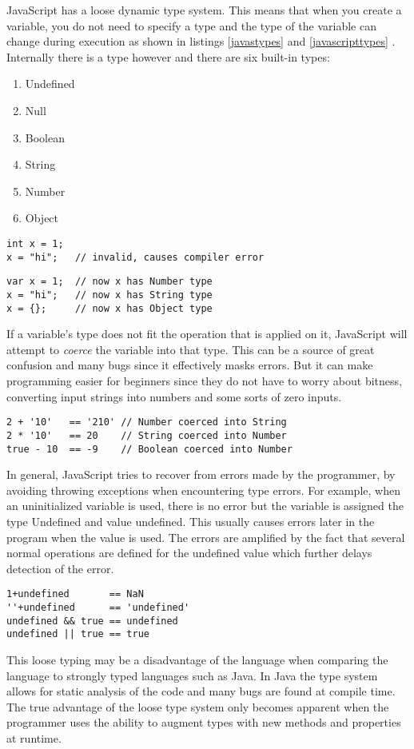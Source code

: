 JavaScript has a loose dynamic type system. This means that when you create a variable, you do not need to specify a type and the type of the variable can change during execution as shown in listings \ref{javastypes} and \ref{javascripttypes} . Internally there is a type however and there are six built-in types:
	\begin{enumerate}
	\item Undefined
	\item Null
	\item Boolean
	\item String
	\item Number
	\item Object
	\end{enumerate}
\begin{lstlisting}[caption=Changing type of variable in Java,label={javatypes}]
int x = 1;
x = "hi";   // invalid, causes compiler error
\end{lstlisting}

\begin{lstlisting}[caption=Changing type of variable in JavaScript,label={javascripttypes}]
var x = 1;  // now x has Number type
x = "hi";   // now x has String type
x = {};     // now x has Object type
\end{lstlisting}
	If a variable's type does not fit the operation that is applied on it, JavaScript will attempt to \emph{coerce} the variable into that type. This can be a source of great confusion and many bugs since it effectively masks errors. But it can make programming easier for beginners since they do not have to worry about bitness, converting input strings into numbers and some sorts of zero inputs.
\begin{lstlisting}[caption=Automatic type coercion]
2 + '10'   == '210' // Number coerced into String
2 * '10'   == 20    // String coerced into Number
true - 10  == -9    // Boolean coerced into Number
\end{lstlisting}

	In general, JavaScript tries to recover from errors made by the programmer, by avoiding throwing exceptions when encountering type errors. For example, when an uninitialized variable is used, there is no error but the variable is assigned the type Undefined and value undefined. This usually causes errors later in the program when the value is used. The errors are amplified by the fact that several normal operations are defined for the undefined value which further delays detection of the error.
\begin{lstlisting}[caption=Normal operations on undefined value]
1+undefined       == NaN
''+undefined      == 'undefined'
undefined && true == undefined
undefined || true == true
\end{lstlisting}	
This loose typing may be a disadvantage of the language when comparing the language to strongly typed languages such as Java. In Java the type system allows for static analysis of the code and many bugs are found at compile time. The true advantage of the loose type system only becomes apparent when the programmer uses the ability to augment types with new methods and properties at runtime.

